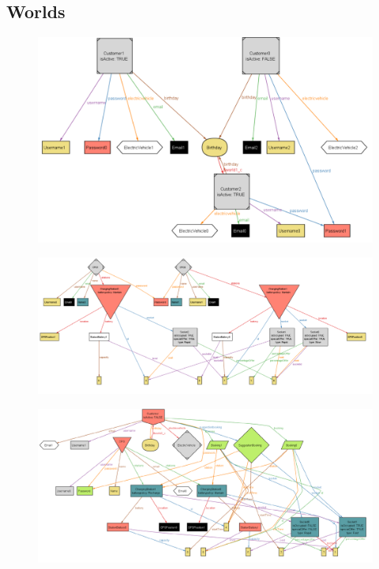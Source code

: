 \begin{landscape}
    \subsection{Worlds}
        \begin{figure}[H]
            \includegraphics[width=1.4\textwidth]{img/world1.pdf}
        \end{figure}
    \begin{figure}[H]
        \includegraphics[width=1.7\textwidth]{img/world2.pdf}
    \end{figure}
    \begin{figure}[H]
        \includegraphics[width=1.7\textwidth]{img/world3.pdf}
    \end{figure}
\end{landscape}